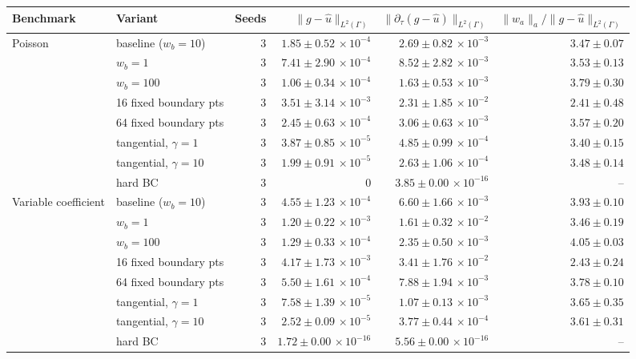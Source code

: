 \begin{tabular}{llrrrr}
\toprule
Benchmark & Variant & Seeds & $\|g-\hat u\|_{L^2(\Gamma)}$ & $\|\partial_\tau(g-\hat u)\|_{L^2(\Gamma)}$ & $\|w_a\|_a/\|g-\hat u\|_{L^2(\Gamma)}$ \\
\midrule
Poisson & baseline ($w_b{=}10$) & 3 & $1.85\pm0.52\,\times\!10^{-4}$ & $2.69\pm0.82\,\times\!10^{-3}$ & $3.47\pm0.07$ \\
 & $w_b{=}1$ & 3 & $7.41\pm2.90\,\times\!10^{-4}$ & $8.52\pm2.82\,\times\!10^{-3}$ & $3.53\pm0.13$ \\
 & $w_b{=}100$ & 3 & $1.06\pm0.34\,\times\!10^{-4}$ & $1.63\pm0.53\,\times\!10^{-3}$ & $3.79\pm0.30$ \\
 & 16 fixed boundary pts & 3 & $3.51\pm3.14\,\times\!10^{-3}$ & $2.31\pm1.85\,\times\!10^{-2}$ & $2.41\pm0.48$ \\
 & 64 fixed boundary pts & 3 & $2.45\pm0.63\,\times\!10^{-4}$ & $3.06\pm0.63\,\times\!10^{-3}$ & $3.57\pm0.20$ \\
 & tangential, $\gamma{=}1$ & 3 & $3.87\pm0.85\,\times\!10^{-5}$ & $4.85\pm0.99\,\times\!10^{-4}$ & $3.40\pm0.15$ \\
 & tangential, $\gamma{=}10$ & 3 & $1.99\pm0.91\,\times\!10^{-5}$ & $2.63\pm1.06\,\times\!10^{-4}$ & $3.48\pm0.14$ \\
 & hard BC & 3 & 0 & $3.85\pm0.00\,\times\!10^{-16}$ & -- \\
\midrule
Variable coefficient & baseline ($w_b{=}10$) & 3 & $4.55\pm1.23\,\times\!10^{-4}$ & $6.60\pm1.66\,\times\!10^{-3}$ & $3.93\pm0.10$ \\
 & $w_b{=}1$ & 3 & $1.20\pm0.22\,\times\!10^{-3}$ & $1.61\pm0.32\,\times\!10^{-2}$ & $3.46\pm0.19$ \\
 & $w_b{=}100$ & 3 & $1.29\pm0.33\,\times\!10^{-4}$ & $2.35\pm0.50\,\times\!10^{-3}$ & $4.05\pm0.03$ \\
 & 16 fixed boundary pts & 3 & $4.17\pm1.73\,\times\!10^{-3}$ & $3.41\pm1.76\,\times\!10^{-2}$ & $2.43\pm0.24$ \\
 & 64 fixed boundary pts & 3 & $5.50\pm1.61\,\times\!10^{-4}$ & $7.88\pm1.94\,\times\!10^{-3}$ & $3.78\pm0.10$ \\
 & tangential, $\gamma{=}1$ & 3 & $7.58\pm1.39\,\times\!10^{-5}$ & $1.07\pm0.13\,\times\!10^{-3}$ & $3.65\pm0.35$ \\
 & tangential, $\gamma{=}10$ & 3 & $2.52\pm0.09\,\times\!10^{-5}$ & $3.77\pm0.44\,\times\!10^{-4}$ & $3.61\pm0.31$ \\
 & hard BC & 3 & $1.72\pm0.00\,\times\!10^{-16}$ & $5.56\pm0.00\,\times\!10^{-16}$ & -- \\

\end{tabular}
